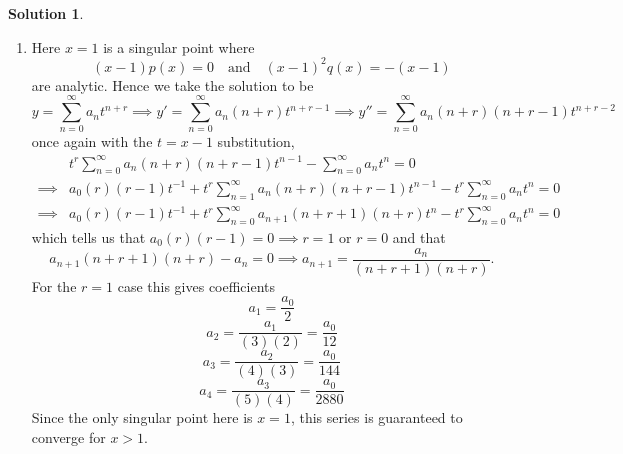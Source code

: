 \documentclass[10pt]{article}
\theoremstyle{definition}
\newtheorem{soln}{Solution}
\begin{document}
\begin{soln}
\begin{enumerate}[label=(\alph*)]
\begin{enumerate}[label=\roman*.]
                  which tells us that
                  $a_0r(r-1)-2a_0=0\implies r=-1\text{ or } r=2$ and that
                  $$a_n(n+r)(n+r-1)+a_{n-1}(n+r-1)-2a_n=0\implies a_n=-a_{n-1}\frac{(n+r-1)}{(n+r)(n+r-1)-2},n\geq 1.$$
                  As usual we take the higher $r$ value just to save on writing,
                  $$a_1=-a_{0}\frac{2}{(3)(2)-2}=-a_0\frac{1}{2}$$
                  $$a_2=-a_{1}\frac{3}{(4)(3)-2}=a_0\frac{3}{20}$$
                  $$a_3=-a_{2}\frac{4}{(5)(4)-2}=-a_0\frac{1}{30}$$
                  $$a_4=-a_{3}\frac{5}{(6)(5)-2}=a_0\frac{1}{168}.$$
                  Since the only singular point here is $x=1$, this series is guaranteed to converge for $x>1$.
            \item Here $x=1$ is a singular point where
                  $$(x-1)p(x)=0\quad\text{and}\quad (x-1)^2q(x)=-(x-1)$$
                  are analytic. Hence we take the solution to be
                  $$y=\sum_{n=0}^{\infty}a_n t^{n+r}\implies y'=\sum_{n=0}^{\infty}a_n(n+r) t^{n+r-1}\implies y''=\sum_{n=0}^{\infty}a_n(n+r)(n+r-1) t^{n+r-2}$$
                  once again with the $t=x-1$ substitution,
                  \begin{align*}
                             & t^r\sum_{n=0}^{\infty}a_n(n+r)(n+r-1) t^{n-1}- \sum_{n=0}^{\infty}a_n t^{n}=0                          \\
                    \implies & a_0(r)(r-1) t^{-1}+t^r\sum_{n=1}^{\infty}a_n(n+r)(n+r-1) t^{n-1}- t^r\sum_{n=0}^{\infty}a_n t^{n}=0    \\
                    \implies & a_0(r)(r-1) t^{-1}+t^r\sum_{n=0}^{\infty}a_{n+1}(n+r+1)(n+r) t^{n}- t^r\sum_{n=0}^{\infty}a_n t^{n} =0
                  \end{align*}
                  which tells us that $a_0(r)(r-1)=0\implies r=1\text{ or } r=0$
                  and that
                  $$a_{n+1}(n+r+1)(n+r) - a_n=0\implies a_{n+1}=\frac{a_n}{(n+r+1)(n+r)}.$$
                  For the $r=1$ case this gives coefficients
                  $$a_{1}=\frac{a_0}{2}$$
                  $$a_{2}=\frac{a_1}{(3)(2)}=\frac{a_0}{12}$$
                  $$a_{3}=\frac{a_2}{(4)(3)}=\frac{a_0}{144}$$
                  $$a_{4}=\frac{a_3}{(5)(4)}=\frac{a_0}{2880}$$
                  Since the only singular point here is $x=1$, this series is guaranteed to converge for $x>1$.
          \end{enumerate}
  \end{enumerate}
\end{soln}
\end{document}
